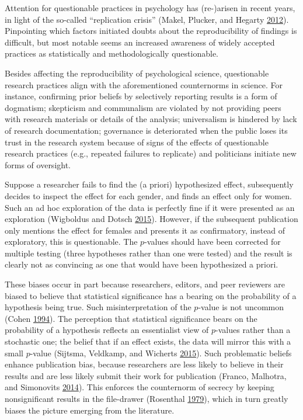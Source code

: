 \documentclass[a5paper]{book}
\begin{document}
Attention for questionable practices in psychology has (re-)arisen in
recent years, in light of the so-called \enquote{replication crisis}
(Makel, Plucker, and Hegarty
\protect\hyperlink{ref-doi:10.1177ux2f1745691612460688}{2012}).
Pinpointing which factors initiated doubts about the reproducibility of
findings is difficult, but most notable seems an increased awareness of
widely accepted practices as statistically and methodologically
questionable.

Besides affecting the reproducibility of psychological science,
questionable research practices align with the aforementioned
counternorms in science. For instance, confirming prior beliefs by
selectively reporting results is a form of dogmatism; skepticism and
communalism are violated by not providing peers with research materials
or details of the analysis; universalism is hindered by lack of research
documentation; governance is deteriorated when the public loses its
trust in the research system because of signs of the effects of
questionable research practices (e.g., repeated failures to replicate)
and politicians initiate new forms of oversight.

Suppose a researcher fails to find the (a priori) hypothesized effect,
subsequently decides to inspect the effect for each gender, and finds an
effect only for women. Such an ad hoc exploration of the data is
perfectly fine if it were presented as an exploration (Wigboldus and
Dotsch \protect\hyperlink{ref-doi:10.1007ux2fs11336-015-9445-1}{2015}).
However, if the subsequent publication only mentions the effect for
females and presents it as confirmatory, instead of exploratory, this is
questionable. The \(p\)-values should have been corrected for multiple
testing (three hypotheses rather than one were tested) and the result is
clearly not as convincing as one that would have been hypothesized a
priori.

These biases occur in part because researchers, editors, and peer
reviewers are biased to believe that statistical significance has a
bearing on the probability of a hypothesis being true. Such
misinterpretation of the \(p\)-value is not uncommon (Cohen
\protect\hyperlink{ref-doi:10.1037ux2f0003-066X.49.12.997}{1994}). The
perception that statistical significance bears on the probability of a
hypothesis reflects an essentialist view of \(p\)-values rather than a
stochastic one; the belief that if an effect exists, the data will
mirror this with a small \(p\)-value (Sijtsma, Veldkamp, and Wicherts
\protect\hyperlink{ref-doi:10.1007ux2fs11336-015-9444-2}{2015}). Such
problematic beliefs enhance publication bias, because researchers are
less likely to believe in their results and are less likely submit their
work for publication (Franco, Malhotra, and Simonovits
\protect\hyperlink{ref-doi:10.1126ux2fscience.1255484}{2014}). This
enforces the counternorm of secrecy by keeping nonsignificant results in
the file-drawer (Rosenthal
\protect\hyperlink{ref-doi:10.1037ux2f0033-2909.86.3.638}{1979}), which
in turn greatly biases the picture emerging from the literature.
\end{document}
